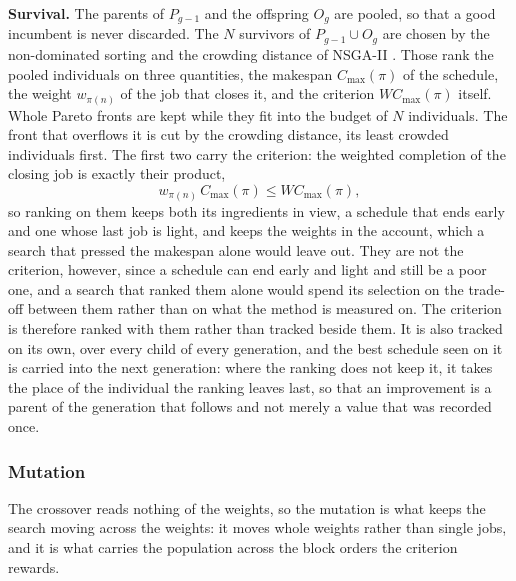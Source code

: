 \documentclass[12pt]{article}
\begin{document}
\begin{sloppypar}
        \textbf{Survival.} The parents of $P_{g-1}$ and the offspring $O_g$ are pooled, so that a good
        incumbent is never discarded. The $N$ survivors of $P_{g-1}\cup O_g$ are chosen by the
        non-dominated sorting and the crowding distance of NSGA-II
        \citep{deb2002fast}. Those rank the pooled individuals on three quantities, the
        makespan $C_{\max}(\pi)$ of the schedule, the weight $w_{\pi(n)}$ of the job that
        closes it, and the criterion $W C_{\max}(\pi)$ itself. Whole Pareto fronts are kept while they
        fit into the budget of $N$ individuals.
        The front that overflows it is cut by the crowding distance, its least crowded individuals
        first. The first two carry the criterion: the weighted completion
        of the closing job is exactly their product,
        \[
        w_{\pi(n)}\,C_{\max}(\pi)\le W C_{\max}(\pi),
        \]
        so ranking on them keeps both its ingredients in view, a schedule that ends early and one
        whose last job is light, and keeps the weights in the account, which a search that pressed the
        makespan alone would leave out. They are not the criterion, however, since a schedule can end
        early and light and still be a poor one, and a search that ranked them alone would spend its
        selection on the trade-off between them rather than on what the method is measured on. The
        criterion is therefore ranked with them rather than tracked beside them. It is also tracked
        on its own, over every child of every generation, and the best schedule seen on it is carried
        into the next generation: where the ranking does not keep it, it takes the place of the
        individual the ranking leaves last, so that an improvement is a parent of the generation that
        follows and not merely a value that was recorded once.
        
        \subsubsection{Mutation}
        The crossover reads nothing of the weights, so the mutation is what keeps the search moving
        across the weights: it moves whole weights rather than single jobs, and it is what carries the
        population across the block orders the criterion rewards.
        

\end{sloppypar}
\end{document}

